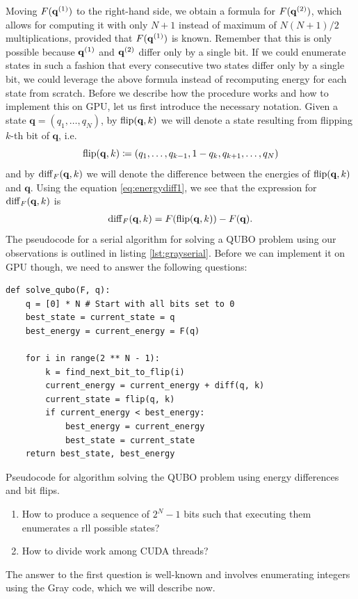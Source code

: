 Moving $F(\mathbf{q}^{(1)})$ to the right-hand side, we obtain a formula for $F(\mathbf{q}^{(2)})$,
which allows for computing it with only $N+1$ instead of maximum of $N(N+1)/2$
multiplications, provided that $F(\mathbf{q}^{(1)})$ is known. Remember that this is only
possible because $\mathbf{q}^{(1)}$ and $\mathbf{q}^{(2)}$ differ only by a single bit. If we could
enumerate states in such a fashion that every consecutive two states differ
only by a single bit, we could leverage the above formula instead of
recomputing energy for each state from scratch. Before we describe how the
procedure works and how to implement this on GPU, let us first introduce the
necessary notation. Given a state $\mathbf{q} = (q_{1},\ldots,q_{N})$, by
$\operatorname*{flip}(\mathbf{q},k)$ we will denote a state resulting from flipping $k$-th
bit of $\mathbf{q}$, i.e.
\begin{equation}
  \operatorname*{flip}(\mathbf{q},k) \coloneq (q_{1}, \ldots, q_{k-1}, 1-q_{k}, q_{k+1}, \ldots, q_{N})
\end{equation}
and by $\operatorname{diff}_{F}(\mathbf{q},k)$ we will denote the difference between the
energies of $\operatorname*{flip}(\mathbf{q},k)$ and $\mathbf{q}$. Using the equation
\eqref{eq:energydiff1}, we see that the expression for
$\operatorname{diff}_{F}(\mathbf{q},k)$ is
\begin{align}
  \begin{split}
    \operatorname{diff}_{F}(\mathbf{q},k) = F(\operatorname*{flip}(\mathbf{q},k)) - F(\mathbf{q}).
  \end{split}
\end{align}
The pseudocode for a serial algorithm for solving a QUBO problem using our
observations is outlined in listing \ref{lst:grayserial}. Before we can
implement it on GPU though, we need to answer the following questions:
\begin{listing}
\begin{verbatim}
def solve_qubo(F, q):
    q = [0] * N # Start with all bits set to 0
    best_state = current_state = q
    best_energy = current_energy = F(q)

    for i in range(2 ** N - 1):
        k = find_next_bit_to_flip(i)
        current_energy = current_energy + diff(q, k)
        current_state = flip(q, k)
        if current_energy < best_energy:
            best_energy = current_energy
            best_state = current_state
    return best_state, best_energy
\end{verbatim}
\caption{Pseudocode for algorithm solving the QUBO problem using energy differences and bit flips.}
\label{lst:grayserial}
\end{listing}
\begin{enumerate}
  \item How to produce a sequence of $2^{N}-1$ bits such that executing them enumerates
    a rll possible states?
  \item How to divide work among CUDA threads?
\end{enumerate}
The answer to the first question is well-known and involves enumerating
integers using the Gray code, which we will describe now.

